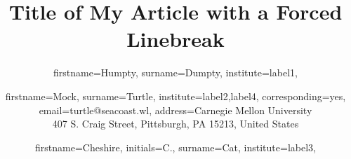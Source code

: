 \documentclass{pbml}
\begin{document}

\title{Title of My Article\titlelinebreak{} with a Forced Linebreak}




\author{
  firstname=Humpty,
  surname=Dumpty,
  institute=label1,
}
\author{
  firstname=Mock,
  surname=Turtle,
  institute={label2,label4},
  corresponding=yes,
  email={turtle@seacoast.wl},
  address={Carnegie Mellon University\\407 S. Craig Street, Pittsburgh, PA 15213, United States}
}
\author{
  firstname=Cheshire,
  initials=C.,
  surname=Cat,
  institute=label3,
}



\end{document}
